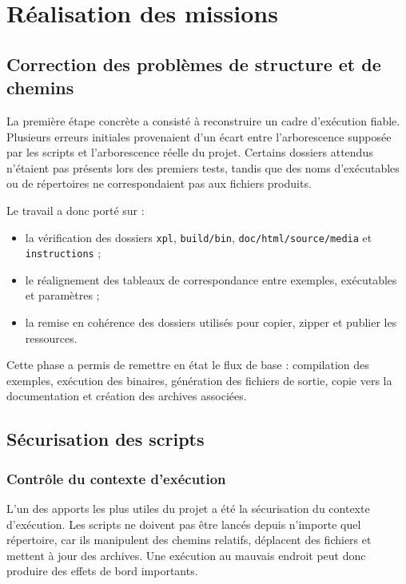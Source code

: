 \documentclass[a4paper,12pt,twoside]{article}
\begin{document}
\section{Réalisation des missions}

\subsection{Correction des problèmes de structure et de chemins}

La première étape concrète a consisté à reconstruire un cadre d'exécution fiable. Plusieurs erreurs initiales provenaient d'un écart entre l'arborescence supposée par les scripts et l'arborescence réelle du projet. Certains dossiers attendus n'étaient pas présents lors des premiers tests, tandis que des noms d'exécutables ou de répertoires ne correspondaient pas aux fichiers produits.

Le travail a donc porté sur :
\begin{itemize}
    \item la vérification des dossiers \texttt{xpl}, \texttt{build/bin}, \texttt{doc/html/source/media} et \texttt{instructions} ;
    \item le réalignement des tableaux de correspondance entre exemples, exécutables et paramètres ;
    \item la remise en cohérence des dossiers utilisés pour copier, zipper et publier les ressources.
\end{itemize}

Cette phase a permis de remettre en état le flux de base : compilation des exemples, exécution des binaires, génération des fichiers de sortie, copie vers la documentation et création des archives associées.

\subsection{Sécurisation des scripts}

\subsubsection{Contrôle du contexte d'exécution}

L'un des apports les plus utiles du projet a été la sécurisation du contexte d'exécution. Les scripts ne doivent pas être lancés depuis n'importe quel répertoire, car ils manipulent des chemins relatifs, déplacent des fichiers et mettent à jour des archives. Une exécution au mauvais endroit peut donc produire des effets de bord importants.
\end{document}
